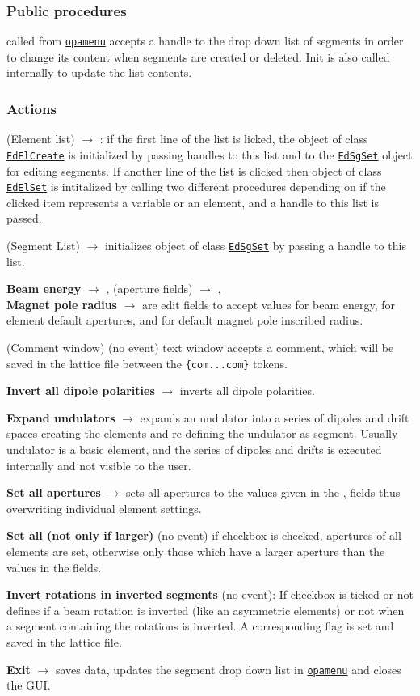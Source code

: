 \documentclass[12pt]{article}
\newcommand\code[1]{{\tt #1}}
\newcommand{\ofld}[1]{\colorbox{black!15}{{\bf #1}}}
\newcommand{\ofldx}[1]{\colorbox{black!15}{(#1)}}
\newcommand\guico[1]{{\color{blue}\code{#1}}}
\newcommand{\unico}[1]{{\color{burntorange}\code{#1}}}
\newcommand{\evcod}[2]{\ofld{#1} $\rightarrow$ \guico{#2}}
\newcommand{\evcodx}[2]{\ofldx{#1} $\rightarrow$ \guico{#2}}
\newcommand{\opagui}[1]{\colorbox{blue!20}{\code{#1}}}
\newcommand{\ogui}[1]{\hyperref[#1]{\opagui{#1}}}
\newcommand{\act}[1]{\subsubsection*{Actions} #1}
\newcommand{\ppro}[1]{\subsubsection*{Public procedures} #1}
\begin{document}
\ppro{
\guico{Init} called from \ogui{opamenu} accepts a handle to the drop down list of segments in order to change its content when segments are created or deleted. Init is also called internally to update the list contents.
}

\act{
\evcodx{Element list}{ListBoxEClick}: if the first line of the list is licked, the object \guico{EditElemCreate} of class \ogui{EdElCreate} is initialized by passing handles to this list and to the \ogui{EdSgSet} object for editing segments. If another line of the list is clicked then object \guico{EditElemSet} of class \ogui{EdElSet} is intitalized by calling two different procedures depending on if the clicked item represents a variable or an element, and a handle to this list is passed.

\evcodx{Segment List}{ListBoxSClick} initializes object \guico{EditSegSet} of class \ogui{EdSgSet} by passing a handle to this list.

\evcod{Beam energy}{EditGloEKeyPress}, \evcodx{aperture fields}{EditA*KeyPress},\\ \evcod{Magnet pole radius}{EdrrefKeyPress} are edit fields to accept values for beam energy, for element default apertures, and for default magnet pole inscribed radius.

\ofldx{Comment window} (no event) text window \guico{MemCom} accepts a comment, which will be saved in the lattice file between the \code{\{com...com\}} tokens.

\evcod{Invert all dipole polarities}{ButDipInv} inverts all dipole polarities.

\evcod{Expand undulators}{ButExpUndClick} expands an undulator into a series of dipoles and drift spaces creating the elements and re-defining the undulator as segment. Usually undulator is a basic element, and the series of dipoles and drifts is executed internally and not visible to the user.

\evcod{Set all apertures}{ButAllAperClick} sets all apertures to the values given in the \guico{EditAx}, \guico{EditAy} fields thus overwriting individual element settings. 

\ofld{Set all (not only if larger)} (no event) if checkbox \guico{ChkAll} is checked, apertures of all elements are set, otherwise only those which have a larger aperture than the values in the fields.

\ofld{Invert rotations in inverted segments} (no event): If  checkbox \guico{ChkGloRi} is ticked or not defines if a beam rotation is inverted (like an asymmetric elements) or not when a segment containing the rotations is  inverted. A corresponding flag \unico{glob.rot\_inv} is set and saved in the lattice file.

\evcod{Exit}{ButExit} saves data, updates the segment drop down list in \ogui{opamenu} and closes the GUI.
}
\end{document}
